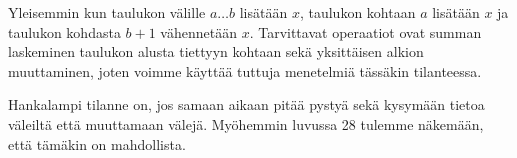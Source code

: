 Yleisemmin kun taulukon välille $a \ldots b$
lisätään $x$, taulukon kohtaan $a$
lisätään $x$ ja taulukon kohdasta $b+1$
vähennetään $x$.
Tarvittavat operaatiot 
ovat summan laskeminen
taulukon alusta tiettyyn kohtaan
sekä yksittäisen alkion muuttaminen,
joten voimme käyttää tuttuja menetelmiä tässäkin tilanteessa.

Hankalampi tilanne on, jos samaan aikaan pitää pystyä
sekä kysymään tietoa väleiltä että muuttamaan välejä.
Myöhemmin luvussa 28 tulemme näkemään,
että tämäkin on mahdollista.

